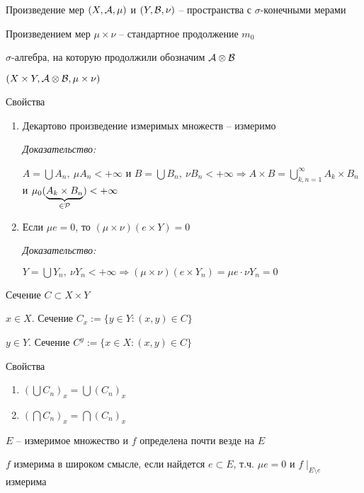 \documentclass[12pt]{article}
\begin{document}
\begin{defin}{Произведение мер}
    $(X, \A, \mu)$ и $(Y, \B, \nu)$ -- пространства с $\sigma$-конечными мерами 

    Произведением мер $\mu \times \nu$ -- стандартное продолжение $m_0$

    $\sigma$-алгебра, на которую продолжили обозначим $\A \otimes \B$

    $(X \times Y, \A \otimes \B, \mu \times \nu)$
\end{defin}

\begin{theo}{Свойства}
    \begin{enumerate}
        \item Декартово произведение измеримых множеств -- измеримо 
        
        \textit{Доказательство:}

        $A = \bigcup A_n,\ \mu A_n < + \infty$ и $B = \bigcup B_n,\ \nu B_n < + \infty \Rightarrow A \times B = \bigcup\limits_{k, n = 1}^\infty A_k \times B_n$ и $\mu_0(\underbrace{A_k \times B_n}_{\in \P}) < + \infty$

        \item Если $\mu e = 0$, то $(\mu \times \nu)(e \times Y) = 0$
        
        \textit{Доказательство:}

        $Y = \bigcup Y_n,\ \nu Y_n < + \infty \Rightarrow (\mu \times \nu)(e \times Y_n) = \mu e \cdot \nu Y_n = 0$
    \end{enumerate}
\end{theo}

\begin{defin}{Сечение}
    $C \subset X \times Y$
    
    $x \in X$. Сечение $C_x :=  \{y \in Y : (x, y) \in C\}$

    $y \in Y$. Сечение $C^y := \{x \in X : (x, y) \in C\}$
\end{defin}

\begin{theo}{Свойства}
    \begin{enumerate}
        \item $(\bigcup C_n)_x = \bigcup (C_n)_x$
        \item $(\bigcap C_n)_x = \bigcap (C_n)_x$
    \end{enumerate}
\end{theo}

\begin{defin}{}
    $E$ -- измеримое множество и $f$ определена почти везде на $E$

    $f$ измерима в широком смысле, если найдется $e \subset E$, т.ч. $\mu e = 0$ и $f\mid_{E \setminus e}$ измерима 
\end{defin}
\end{document}
